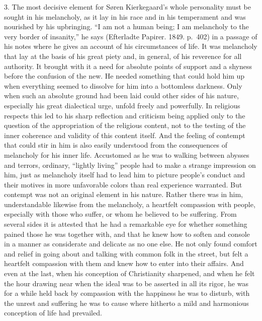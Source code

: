 \documentclass[12pt,a4paper]{book}
\newcommand{\opage}[1]{\marginnote{\footnotesize\textit{[#1]}}}
\begin{document}
3. The most decisive element for Søren Kierkegaard's whole personality
must be sought in his melancholy, as it lay in his race and in his
temperament and was nourished by his upbringing. ``I am not a human
being; I am melancholy to the very border of insanity,'' he says
(Efterladte Papirer. 1849. p.~402) in a passage of his notes where he
gives an account of his circumstances of life. It was melancholy that lay
at the basis of his great piety and, in general, of his reverence for all
authority. It brought with it a need for absolute points of support and a
shyness before the confusion of the new. He needed something that could
hold him up when everything seemed to dissolve for him into a bottomless
darkness. Only when such an absolute ground had been laid could other
sides of his nature, especially his great dialectical urge, unfold freely
and powerfully. In religious respects this led to his sharp reflection
and criticism being applied only to the question of the appropriation of
the religious content, not to the testing of the inner coherence and
validity of this content itself. And the feeling of contempt that could
stir in him is also easily understood from the consequences of
melancholy for his inner life. Accustomed as he was to walking between
abysses and terrors, ordinary, ``lightly living'' people had to make a
strange impression on him, just as melancholy itself had to lead him to
picture people's conduct and their motives in more unfavorable colors
than real experience warranted. But contempt was not an original element
in his nature. Rather there was in him, understandable likewise from the melancholy, a
heartfelt
\opage{32}compassion with people, especially with those who suffer, or
whom he believed to be suffering. From several sides it is attested that
he had a remarkable eye for whether something pained those he was
together with, and that he knew how to soften and console in a manner as
considerate and delicate as no one else. He not only found comfort and
relief in going about and talking with common folk in the street, but
felt a heartfelt compassion with them and knew how to enter into their
affairs. And even at the last, when his conception of Christianity
sharpened, and when he felt the hour drawing near when the ideal was to
be asserted in all its rigor, he was for a while held back by compassion
with the happiness he was to disturb, with the unrest and suffering he
was to cause where hitherto a mild and harmonious conception of life had
prevailed.
\end{document}

